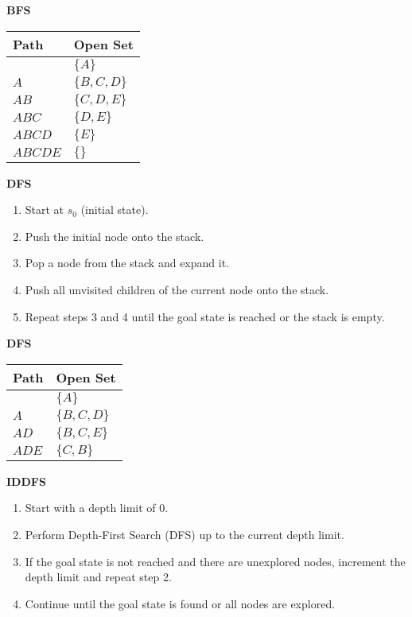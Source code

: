 \begin{example} \textbf{BFS}
    \begin{center}
        \begin{tabular}{ll}
        \toprule
        \textbf{Path} & \textbf{Open Set} \\
        \midrule
         & $\{A\}$ \\
        $A$ & $\{B, C, D\}$ \\
        $AB$ & $\{C, D, E\}$ \\
        $ABC$ & $\{D, E\}$ \\
        $ABCD$ & $\{E\}$ \\
        $ABCDE$ & $\{\}$ \\
        \bottomrule
        \end{tabular}
    \end{center}
\end{example}

\begin{process} \textbf{DFS}
    \begin{enumerate}
        \item Start at $s_0$ (initial state).
        \item Push the initial node onto the stack.
        \item Pop a node from the stack and expand it.
        \item Push all unvisited children of the current node onto the stack.
        \item Repeat steps 3 and 4 until the goal state is reached or the stack is empty.
    \end{enumerate}
\end{process}

\begin{example} \textbf{DFS}
    \begin{center}
        \begin{tabular}{ll}
        \toprule
        \textbf{Path} & \textbf{Open Set} \\
        \midrule
         & $\{A\}$ \\
        $A$ & $\{B,C,D\}$ \\
        $AD$ & $\{B,C,E\}$ \\
        $ADE$ & $\{C, B\}$ \\
        \bottomrule
        \end{tabular}
    \end{center}
\end{example}


\begin{process} \textbf{IDDFS}
    \begin{enumerate}
        \item Start with a depth limit of 0.
        \item Perform Depth-First Search (DFS) up to the current depth limit.
        \item If the goal state is not reached and there are unexplored nodes, increment the depth limit and repeat step 2.
        \item Continue until the goal state is found or all nodes are explored.
    \end{enumerate}
\end{process}

